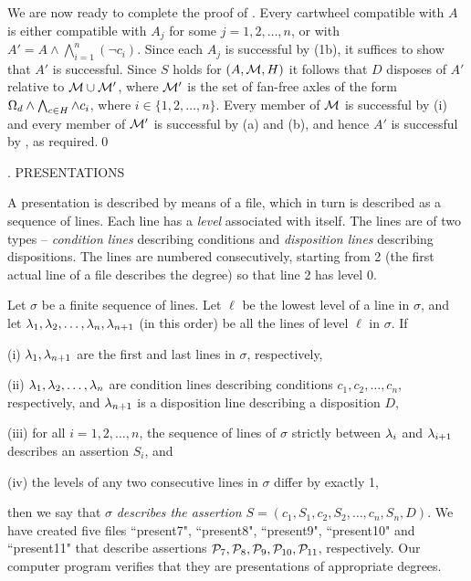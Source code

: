 We are now ready to complete the proof of \fthree.  Every cartwheel compatible 
with $A$ is 
either compatible with $A_j$ for some $j=1,2,\dots, n$, or with $A'=A\wedge
\bigwedge^n_{i=1} (\neg c_i)$.  Since each $A_j$ is successful by (1b),
it  suffices
to show that $A'$ is successful.  Since $S$ holds for $(A,{\cal M}, H)$ it follows 
that $D$
disposes of $A'$ relative to ${\cal M}\cup{\cal M}'$, where ${\cal M}'$ is the 
set of fan-free
axles of the form $\Omega_d\wedge\bigwedge_{c\in H}\wedge c_i$, where $i\in 
\{1,2,\dots, n\}$.
Every member of ${\cal M}$ is successful by (i) and every member of ${\cal M}'$ 
is successful
by (a) and (b), and hence $A'$ is successful by \fone, as required.\qed

.  PRESENTATIONS

A presentation is described by means of a file, which in turn is described 
as a sequence
of lines.  Each line has a {\it level} associated with itself.  The lines 
are of two 
types -- {\it condition lines} describing conditions and {\it disposition 
lines} describing
dispositions.  The lines are numbered consecutively, starting from 2 (the 
first actual line of a file
describes the degree) so that line 2 has level 0.

Let $\sigma$ be a finite sequence of lines.  Let $\ell$ be the lowest 
level of a line
in $\sigma$, and let $\lambda_1,\lambda_2,\dots, \lambda_n,\lambda_{n+1}$ (in this 
order)
be all the lines of level $\ell$  in $\sigma$. If
\item{(i)} $\lambda_1,\lambda_{n+1}$ are the first and last lines in $\sigma$, 
respectively,
\item{(ii)} $\lambda_1,\lambda_2,\dots, \lambda_n$ are condition lines
describing conditions $c_1,c_2,\dots, c_n$, respectively, and $\lambda_{n+1}$
is a disposition line describing a disposition $D$, 
\item{(iii)} for all $i=1,2,\dots, n$, the sequence of lines of $\sigma$ 
strictly between
$\lambda_i$ and $\lambda_{i+1}$ describes an assertion $S_i$, and
\item{(iv)} the levels of any two consecutive lines in $\sigma$ differ 
by exactly 1,

\noindent then we say that $\sigma$ {\it describes the assertion}
$S=(c_1,S_1,c_2,S_2,\dots, c_n,S_n,D)$.  
We have created five files ``present7", ``present8",
``present9",  ``present10" and
``present11" that describe assertions ${\cal P}_7,{\cal P}_8,
{\cal P}_9,{\cal P}_{10},  {\cal P}_{11}$,
respectively.  Our computer program verifies that they are presentations 
of appropriate degrees.


